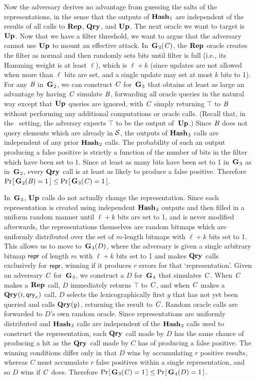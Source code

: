 Now the adversary derives no advantage from guessing the salts of the
representations, in the sense that the outputs of $\textup{\textbf{Hash}}\hspace{0.5pt}_1$ are independent of the results
of all calls to $\textup{\textbf{Rep}}\hspace{0.5pt}$, $\textup{\textbf{Qry}}\hspace{0.5pt}$, and $\textup{\textbf{Up}}\hspace{0.5pt}$. The next oracle we want to target
is $\textup{\textbf{Up}}\hspace{0.5pt}$. Now that we have a filter threshold, we want to argue that the
adversary cannot use $\textup{\textbf{Up}}\hspace{0.5pt}$ to mount an effective attack.
%
In~$\textup{\textbf{G}}\hspace{0.5pt}_3(\mathit{C})$, the $\textup{\textbf{Rep}}\hspace{0.5pt}$ oracle creates the filter as normal and then
randomly sets bits until filter is full (i.e., its Hamming weight is at least
$\ell$), which is $\ell+k$ (since
updates are not allowed when more than $\ell$ bits are set, and a single update
may set at most $k$ bits to 1). For any $\mathit{B}$ in~$\textup{\textbf{G}}\hspace{0.5pt}_2$, we can construct
$\mathit{C}$ for~$\textup{\textbf{G}}\hspace{0.5pt}_3$ that obtains at least as large an advantage by having $\mathit{C}$
simulate $\mathit{B}$, forwarding all oracle queries in the natural way except that
$\textup{\textbf{Up}}\hspace{0.5pt}$ queries are ignored, with $\mathit{C}$ simply returning $\top$ to $\mathit{B}$ without
performing any additional computations or oracle calls. (Recall that, in the
\erreps\ setting, the adversry expects $\top$ to be the output of~$\textup{\textbf{Up}}\hspace{0.5pt}$.) Since $\mathit{B}$ does not
query elements which are already in $\mathcal{S}$, the outputs of $\textup{\textbf{Hash}}\hspace{0.5pt}_3$ calls are
independent of any prior $\textup{\textbf{Hash}}\hspace{0.5pt}_2$ calls.
%
The probability of such an output producing a false positive is strictly a
function of the number of bits in the filter which have been set to 1.
%
Since at least as many bits have been set to 1 in~$\textup{\textbf{G}}\hspace{0.5pt}_3$ as in~$\textup{\textbf{G}}\hspace{0.5pt}_2$,
every $\textup{\textbf{Qry}}\hspace{0.5pt}$ call is at least as likely to produce a false positive. Therefore
$\Pr\hspace{-1pt}\left[\,\textup{\textbf{G}}\hspace{0.5pt}_2(\mathit{B}) = 1\,\right] \le \Pr\hspace{-1pt}\left[\,\textup{\textbf{G}}\hspace{0.5pt}_3(\mathit{C}) = 1\,\right]$.

In~$\textup{\textbf{G}}\hspace{0.5pt}_3$, $\textup{\textbf{Up}}\hspace{0.5pt}$ calls do not actually change the representation. Since each
representation is created using independent $\textup{\textbf{Hash}}\hspace{0.5pt}_2$ outputs and then filled
in a uniform random manner until $\ell+k$ bits are set to 1, and is never
modified afterwards, the representations
themselves are random bitmaps which are uniformly distributed over the set of
$m$-length bitmaps with $\ell+k$ bits set to 1. This allows us to move
to~$\textup{\textbf{G}}\hspace{0.5pt}_4(D)$, where the adversary is given a single arbitrary bitmap $\mathsf{repr}$
of length $m$ with $\ell+k$ bits set to 1 and makes $\textup{\textbf{Qry}}\hspace{0.5pt}$ calls exclusively
for $\mathsf{repr}$, winning if it produces $r$ errors for that `representation'. Given
an adversary $\mathit{C}$ for~$\textup{\textbf{G}}\hspace{0.5pt}_3$, we construct a $D$ for~$\textup{\textbf{G}}\hspace{0.5pt}_4$ that simulates
$\mathit{C}$. When $\mathit{C}$ makes a $\textup{\textbf{Rep}}\hspace{0.5pt}$ call, $D$ immediately returns $\top$ to $\mathit{C}$, and
when $\mathit{C}$ makes a $\textup{\textbf{Qry}}\hspace{0.5pt}(i,\mathsf{qry}_x)$ call, $D$ selects the lexicographically first
$y$ that has not yet been queried and calls $\textup{\textbf{Qry}}\hspace{0.5pt}(y)$, returning the result to
$\mathit{C}$. Random oracle calls are forwarded to $D$'s own random oracle.
Since representations are uniformly distributed and $\textup{\textbf{Hash}}\hspace{0.5pt}_3$ calls are
independent of the $\textup{\textbf{Hash}}\hspace{0.5pt}_2$ calls used to construct the representation, each
$\textup{\textbf{Qry}}\hspace{0.5pt}$ call made by $D$ has the same chance of producing a hit as the $\textup{\textbf{Qry}}\hspace{0.5pt}$
call made by $C$ has of producing a false positive.
%
The winning conditions differ
only in that $D$ wins by accumulating $r$ positive results, whereas $C$ must
accumulate $r$ false positives within a single representation, and so $D$ wins
if $\mathit{C}$ does. Therefore $\Pr\hspace{-1pt}\left[\,\textup{\textbf{G}}\hspace{0.5pt}_3(\mathit{C}) = 1\,\right] \le \Pr\hspace{-1pt}\left[\,\textup{\textbf{G}}\hspace{0.5pt}_4(D) = 1\,\right]$.

